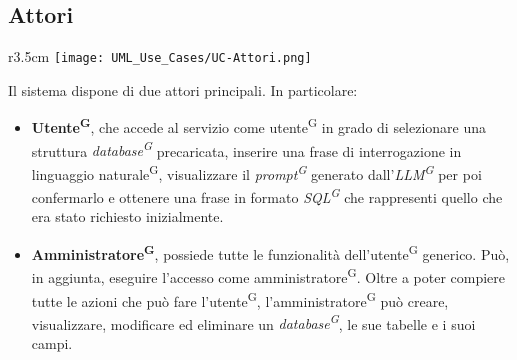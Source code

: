 \subsection{Attori}
\begin{wrapfigure}{r}{3.5cm}
	\texttt{[image: UML\_Use\_Cases/UC-Attori.png]}
\end{wrapfigure}
Il sistema dispone di due attori principali. In particolare:
\begin{itemize}
	\item \textbf{Utente\textsuperscript{G}}, che accede al servizio come utente\textsuperscript{G} in grado di selezionare una struttura \textit{database\textsuperscript{G}} precaricata, inserire una frase di interrogazione in linguaggio naturale\textsuperscript{G}, visualizzare il \textit{prompt\textsuperscript{G}} generato dall'\textit{LLM\textsuperscript{G}} per poi confermarlo e ottenere una frase in formato \textit{SQL\textsuperscript{G}} che rappresenti quello che era stato richiesto inizialmente.

	\item \textbf{Amministratore\textsuperscript{G}}, possiede tutte le funzionalità dell'utente\textsuperscript{G} generico. Può, in aggiunta, eseguire l'accesso come amministratore\textsuperscript{G}. Oltre a poter compiere tutte le azioni che può fare l'utente\textsuperscript{G}, l'amministratore\textsuperscript{G} può creare, visualizzare, modificare ed eliminare un \textit{database\textsuperscript{G}}, le sue tabelle e i suoi campi.
\end{itemize}

\setcounter{secnumdepth}{0}

